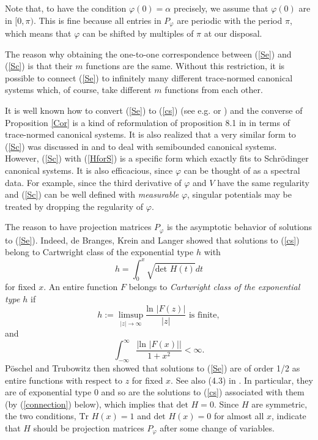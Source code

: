 \documentclass[preprint,12pt]{elsarticle}
\begin{document}
Note that, to have the condition $\varphi(0)=\alpha$ precisely, we assume that $\varphi(0)$ are in $[0,\pi)$. This is fine because all entries in $P_{\varphi}$ are periodic with the period $\pi$,  which means that $\varphi$ can be shifted by multiples of $\pi$ at our disposal. 

 The reason why obtaining the one-to-one correspondence between (\ref{Se}) and (\ref{Sc}) is that their $m$ functions are the same. Without this restriction, it is possible to connect (\ref{Se}) to infinitely many different trace-normed canonical systems which, of course, take different $m$ functions from each other.

 It is well known how to convert (\ref{Se}) to (\ref{cs}) (see e.g.  \cite{Achtw} or \cite{RemdB}) and the converse of Proposition \ref{Cor} is a kind of reformulation of proposition 8.1 in \cite{RemdB}  in terms of trace-normed canonical systems. It is also realized that a very similar form to (\ref{Sc}) was discussed in \cite{L&W} and \cite{W&W} to deal with semibounded canonical systems. However, (\ref{Sc}) with (\ref{HforS}) is a specific form which exactly fits to Schr\"odinger canonical systems. It is also efficacious, since $\varphi$ can be thought of as a spectral data. For example, since the third derivative of $\varphi$ and $V$ have the same regularity and (\ref{Sc}) can be well defined with \textit{measurable} $\varphi$, singular potentials may be treated by dropping the regularity of $\varphi$. 

The reason to have projection matrices $P_{\varphi}$ is the asymptotic behavior of solutions to (\ref{Se}).  Indeed, de Branges, Krein and Langer \cite{deB2,KL} showed that solutions to (\ref{cs}) belong to Cartwright class of the exponential type $h$ with
\begin{equation*}
h=\int_0^x \sqrt{\textrm{det }H(t)}dt
\end{equation*}
for fixed $x$. An entire function $F$ belongs to \textit {Cartwright class of the exponential type $h$} if 
\begin{equation*}
h:=\limsup_{|z|\to\infty}\frac{\textrm{ln }|F(z)|}{|z|} \textrm{ is finite}, 
\end{equation*}
and 
\begin{equation*}
\int_{-\infty}^{\infty}\frac{ | \textrm{ln } |F(x)| |}{1+x^2}<\infty. 
\end{equation*}
P\"oschel and Trubowitz \cite{P&T} then showed that solutions to (\ref{Se}) are of order 1/2 as entire functions with respect to $z$ for fixed $x$. See also (4.3) in \cite{RemdB}. In particular, they are of exponential type 0 and so are the solutions to (\ref{cs}) associated with them (by (\ref{connection}) below), which implies that  $\textrm{det }H=0$. Since $H$ are symmetric, the two conditions, $\textrm{Tr }H(x)=1$ and $\textrm{det }H(x)=0$ for almost all $x$, indicate that $H$ should be projection matrices $P_{\varphi}$ after some change of variables.\\ 
\end{document}
